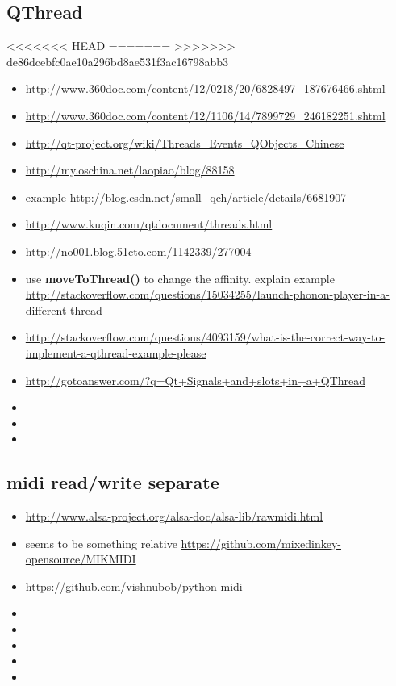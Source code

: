 \documentclass[9pt,b5paper]{article}
\begin{document}
\subsection{QThread}
<<<<<<< HEAD
\label{sec-18-22}
=======
\label{sec-17-22}
>>>>>>> de86dcebfc0ae10a296bd8ae531f3ac16798abb3
\begin{itemize}
\item \url{http://www.360doc.com/content/12/0218/20/6828497_187676466.shtml}
\item \url{http://www.360doc.com/content/12/1106/14/7899729_246182251.shtml}
\item \url{http://qt-project.org/wiki/Threads_Events_QObjects_Chinese}
\item \url{http://my.oschina.net/laopiao/blog/88158}
\item example \url{http://blog.csdn.net/small_qch/article/details/6681907}
\item \url{http://www.kuqin.com/qtdocument/threads.html}
\item \url{http://no001.blog.51cto.com/1142339/277004}
\item use \textbf{moveToThread()} to change the affinity. explain example \url{http://stackoverflow.com/questions/15034255/launch-phonon-player-in-a-different-thread}
\item \url{http://stackoverflow.com/questions/4093159/what-is-the-correct-way-to-implement-a-qthread-example-please}
\item \url{http://gotoanswer.com/?q=Qt+Signals+and+slots+in+a+QThread}
\item 
\item 
\item 
\end{itemize}
\subsection{midi read/write separate}
\label{sec-18-23}
\begin{itemize}
\item \url{http://www.alsa-project.org/alsa-doc/alsa-lib/rawmidi.html}
\item seems to be something relative \url{https://github.com/mixedinkey-opensource/MIKMIDI}
\item \url{https://github.com/vishnubob/python-midi}
\item 
\item 
\item 
\item 
\item 
\end{itemize}
\end{document}
